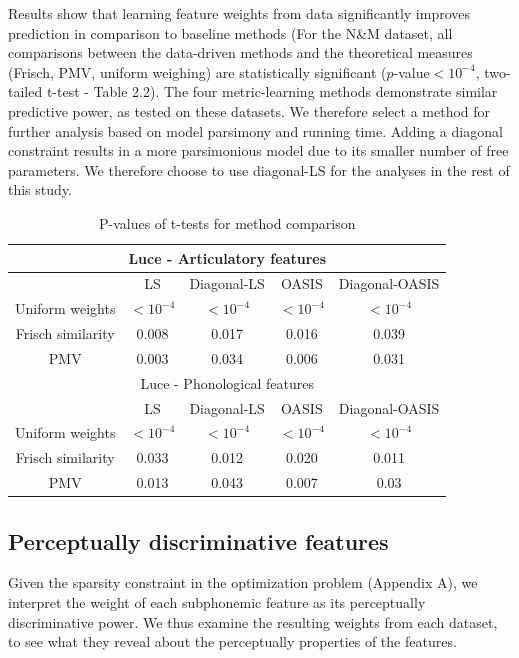 Results show that learning feature weights from data significantly improves prediction in comparison to baseline methods (For the N\&M dataset, all comparisons between the data-driven methods and the theoretical measures (Frisch, PMV, uniform weighing) are statistically significant ($p$-value$<10^{-4}$, two-tailed t-test - Table 2.2). The four metric-learning methods demonstrate similar predictive power, as tested on these datasets. We therefore select a method for further analysis based on model parsimony and running time. Adding a diagonal constraint results in a more parsimonious model due to its smaller number of free parameters. We therefore choose to use diagonal-LS for the analyses in the rest of this study.

\begin{table}[H]
    \centering
    \begin{tabular}{|c|c|c|c|c|}
        \hline
        \multicolumn{5}{|c|}{Luce - Articulatory features}\\
        \hline
         & LS & Diagonal-LS & OASIS & Diagonal-OASIS \\
         \hline
         Uniform weights & $<10^{-4}$ & $<10^{-4}$ & $<10^{-4}$ & $<10^{-4}$ \\
         Frisch similarity & 0.008 &    0.017 &    0.016 &    0.039 \\
         PMV & 0.003 &    0.034 &    0.006 &    0.031 \\
         \hline
         \multicolumn{5}{|c|}{Luce - Phonological features}\\
         \hline
         & LS & Diagonal-LS & OASIS & Diagonal-OASIS \\
         \hline
         Uniform weights & $<10^{-4}$ &  $<10^{-4}$ & $<10^{-4}$ & $<10^{-4}$ \\
         Frisch similarity & 0.033 &    0.012 &    0.020 &    0.011 \\
         PMV & 0.013 &    0.043 &    0.007 &    0.03 \\
         \hline
         
    \end{tabular}
    \caption{P-values of t-tests for method comparison}
\end{table}


\subsection{Perceptually discriminative features}
Given the sparsity constraint in the optimization problem (Appendix A), we interpret the weight of each subphonemic feature as its perceptually discriminative power. We thus examine the resulting weights from each dataset, to see what they reveal about the perceptually properties of the features.

